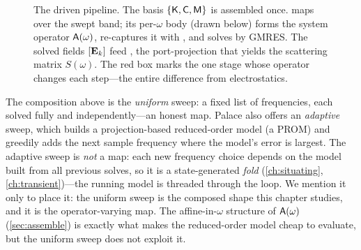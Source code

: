 \begin{figure}[t]
\centering
{}
\caption[The driven pipeline]{The driven pipeline. The basis
$\{\mathsf{K},\mathsf{C},\mathsf{M}\}$ is assembled once.  maps over the
swept band; its per-$\omega$ body (drawn below) forms the system operator
$\mathsf{A}(\omega)$, re-captures it with , and solves by GMRES.
The solved fields $[\mathbf{E}_k]$ feed , the port-projection
that yields the scattering matrix $S(\omega)$. The red box marks the one stage
whose operator changes each step---the entire difference from electrostatics.}
\label{fig:pipeline}
\end{figure}

\begin{remark}
The composition above is the \emph{uniform} sweep: a fixed list of frequencies,
each solved fully and independently---an honest map. Palace also offers an
\emph{adaptive} sweep, which builds a projection-based reduced-order model (a PROM)
and greedily adds the next sample frequency where the model's error is largest. The
adaptive sweep is \emph{not} a map: each new frequency choice depends on the model
built from all previous solves, so it is a state-generated \emph{fold}
(\cref{ch:situating}, \cref{ch:transient})---the running model is threaded through
the loop. We mention it only to place it: the uniform sweep is the composed shape
this chapter studies, and it is the operator-varying map. The affine-in-$\omega$
structure of $\mathsf{A}(\omega)$ (\cref{sec:assemble}) is exactly what makes the
reduced-order model cheap to evaluate, but the uniform sweep does not exploit it.
\end{remark}

